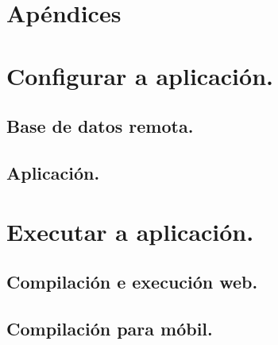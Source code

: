 \newpage
\chapter*{Apéndices}
\thispagestyle{empty}
\newpage
\chapter{Configurar a aplicación.}
\label{chap:configuracion_aplicacion}
  \section{Base de datos remota.}
  \section{Aplicación.}

\clearpage
\chapter{Executar a aplicación.}
\label{chap:configuracion_aplicacion}
  \section{Compilación e execución web.}
  \section{Compilación para móbil.}
\thispagestyle{empty}

